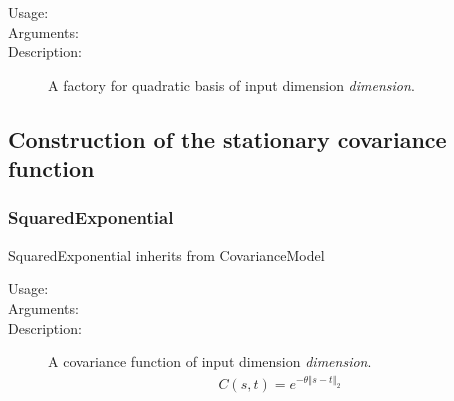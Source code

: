 \begin{description}
\item[Usage:] \rule{0pt}{1em}


\item[Arguments:] \rule{0pt}{1em}

\item[Description:] A factory for quadratic basis of input dimension \textit{dimension}.

\end{description}


\newpage
\subsection{Construction of the stationary covariance function}

\subsubsection{SquaredExponential}

SquaredExponential inherits from CovarianceModel

\begin{description}
\item[Usage:] \rule{0pt}{1em}


\item[Arguments:] \rule{0pt}{1em}

\item[Description:] A covariance function of input dimension \textit{dimension}.
\begin{align*}
C(s, t) = \displaystyle e^{- \theta \left\Vert s - t \right\Vert_2}
\end{align*}

\end{description}

